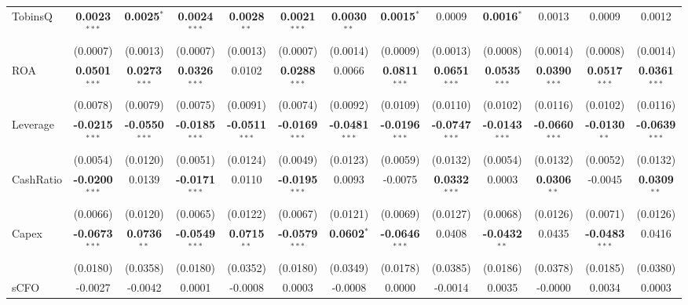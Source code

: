 \begin{landscape}
\begin{table}[H]
\begin{tabular}{lcccccccccccc}
TobinsQ & \textbf{0.0023}$^{***}$ & \textbf{0.0025}$^{*}$ & \textbf{0.0024}$^{***}$ & \textbf{0.0028}$^{**}$ & \textbf{0.0021}$^{***}$ & \textbf{0.0030}$^{**}$ & \textbf{0.0015}$^{*}$ & 0.0009 & \textbf{0.0016}$^{*}$ & 0.0013 & 0.0009 & 0.0012 \\
 & (0.0007) & (0.0013) & (0.0007) & (0.0013) & (0.0007) & (0.0014) & (0.0009) & (0.0013) & (0.0008) & (0.0014) & (0.0008) & (0.0014) \\
ROA & \textbf{0.0501}$^{***}$ & \textbf{0.0273}$^{***}$ & \textbf{0.0326}$^{***}$ & 0.0102 & \textbf{0.0288}$^{***}$ & 0.0066 & \textbf{0.0811}$^{***}$ & \textbf{0.0651}$^{***}$ & \textbf{0.0535}$^{***}$ & \textbf{0.0390}$^{***}$ & \textbf{0.0517}$^{***}$ & \textbf{0.0361}$^{***}$ \\
 & (0.0078) & (0.0079) & (0.0075) & (0.0091) & (0.0074) & (0.0092) & (0.0109) & (0.0110) & (0.0102) & (0.0116) & (0.0102) & (0.0116) \\
Leverage & \textbf{-0.0215}$^{***}$ & \textbf{-0.0550}$^{***}$ & \textbf{-0.0185}$^{***}$ & \textbf{-0.0511}$^{***}$ & \textbf{-0.0169}$^{***}$ & \textbf{-0.0481}$^{***}$ & \textbf{-0.0196}$^{***}$ & \textbf{-0.0747}$^{***}$ & \textbf{-0.0143}$^{***}$ & \textbf{-0.0660}$^{***}$ & \textbf{-0.0130}$^{**}$ & \textbf{-0.0639}$^{***}$ \\
 & (0.0054) & (0.0120) & (0.0051) & (0.0124) & (0.0049) & (0.0123) & (0.0059) & (0.0132) & (0.0054) & (0.0132) & (0.0052) & (0.0132) \\
CashRatio & \textbf{-0.0200}$^{***}$ & 0.0139 & \textbf{-0.0171}$^{***}$ & 0.0110 & \textbf{-0.0195}$^{***}$ & 0.0093 & -0.0075 & \textbf{0.0332}$^{***}$ & 0.0003 & \textbf{0.0306}$^{**}$ & -0.0045 & \textbf{0.0309}$^{**}$ \\
 & (0.0066) & (0.0120) & (0.0065) & (0.0122) & (0.0067) & (0.0121) & (0.0069) & (0.0127) & (0.0068) & (0.0126) & (0.0071) & (0.0126) \\
Capex & \textbf{-0.0673}$^{***}$ & \textbf{0.0736}$^{**}$ & \textbf{-0.0549}$^{***}$ & \textbf{0.0715}$^{**}$ & \textbf{-0.0579}$^{***}$ & \textbf{0.0602}$^{*}$ & \textbf{-0.0646}$^{***}$ & 0.0408 & \textbf{-0.0432}$^{**}$ & 0.0435 & \textbf{-0.0483}$^{***}$ & 0.0416 \\
 & (0.0180) & (0.0358) & (0.0180) & (0.0352) & (0.0180) & (0.0349) & (0.0178) & (0.0385) & (0.0186) & (0.0378) & (0.0185) & (0.0380) \\
sCFO & -0.0027 & -0.0042 & 0.0001 & -0.0008 & 0.0003 & -0.0008 & 0.0000 & -0.0014 & 0.0035 & -0.0000 & 0.0034 & 0.0003 \\

\end{tabular}
\end{table}
\end{landscape}

